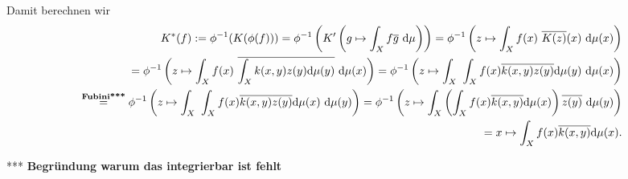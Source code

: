 \begin{solution}
  Damit berechnen wir
  \begin{align}
      K^*(f) := \phi^{-1}(K(\phi(f))) = \phi^{-1}\left(K^\prime\left(g \mapsto \int_X f\overline g ~\mathrm{d}\mu\right)\right)
      = \phi^{-1}\left(z \mapsto \int_X f(x) ~\overline{K(z)}(x) ~\mathrm{d}\mu(x)\right) \\
      = \phi^{-1}\left(z \mapsto \int_X f(x)
      ~\overline{\int_X k(x,y) z(y) \mathrm{d}\mu(y)}
      ~\mathrm{d}\mu(x)\right)
      = \phi^{-1}\left(z \mapsto \int_X
      ~\int_X f(x) \overline{k(x,y)} \overline{z(y)} \mathrm{d}\mu(y)
      ~\mathrm{d}\mu(x)\right) \\
      \stackrel{\text{\textbf{Fubini***}}}{=} \phi^{-1}\left(z \mapsto \int_X
      ~\int_X f(x) \overline{k(x,y)} \overline{z(y)} \mathrm{d}\mu(x)
      ~\mathrm{d}\mu(y)\right)
      = \phi^{-1}\left(z \mapsto \int_X
      \left(\int_X f(x) \overline{k(x,y)} \mathrm{d}\mu(x) \right) \overline{z(y)}
      ~\mathrm{d}\mu(y)\right) \\
      = x \mapsto \int_X f(x) \overline{k(x,y)} \mathrm{d}\mu(x).
  \end{align}

  *** \textbf{Begründung warum das integrierbar ist fehlt}


\end{solution}
